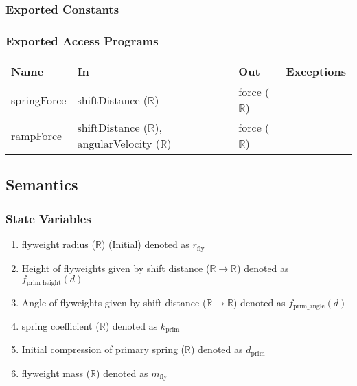 \documentclass[12pt, titlepage]{article}
\begin{document}
\subsubsection{Exported Constants}

\subsubsection{Exported Access Programs}

\begin{center}
\begin{tabular}{p{2.5cm} p{4cm} p{4cm} p{2cm}}
\hline
\textbf{Name} & \textbf{In} & \textbf{Out} & \textbf{Exceptions} \\
\hline
springForce & shiftDistance ($\mathbb{R}$) & force ($\mathbb{R}$) & - \\
rampForce & shiftDistance ($\mathbb{R}$), angularVelocity ($\mathbb{R}$) & force ($\mathbb{R}$) & \\
\hline
\end{tabular}
\end{center}

\subsection{Semantics}

\subsubsection{State Variables}

\begin{enumerate}
  \item flyweight radius ($\mathbb{R}$) (Initial) denoted as $r_{\text{fly}}$
  \item Height of flyweights given by shift distance ($\mathbb{R} \rightarrow \mathbb{R}$) denoted as $f_{\text{prim\_height}}(d)$
  \item Angle of flyweights given by shift distance ($\mathbb{R} \rightarrow \mathbb{R}$) denoted as $f_{\text{prim\_angle}}(d)$
  \item spring coefficient ($\mathbb{R}$) denoted as $k_{\text{prim}}$

  \item Initial compression of primary spring ($\mathbb{R}$) denoted as $d_{\text{prim}}$
  \item flyweight mass ($\mathbb{R}$) denoted as $m_\text{fly}$
\end{enumerate}
\end{document}
